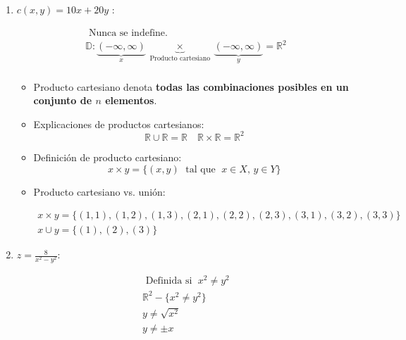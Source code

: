 \begin{enumerate}
    \item $c(x,y)=10x+20y$ : 
        \begin{center}
           \begin{align*}
               \text{  Nunca se indefine.  } \\ 
               \mathbb{D}: \underbrace{(-\infty,\infty )}_{x} \underbrace{\times}_{\text{  Producto cartesiano  }} \underbrace{(-\infty ,\infty )}_{y} = \mathbb{R}^2 \\ 
           \end{align*}
           \begin{itemize}[label=\#]
               \item Producto cartesiano denota \textbf{todas las combinaciones posibles en un conjunto de $n$ elementos}.
               \item Explicaciones de productos cartesianos:
                \[
                  \mathbb{R} \cup  \mathbb{R} = \mathbb{R} \quad \mathbb{R} \times \mathbb{R} = \mathbb{R}^2     
                \]
                
                \item Definición de producto cartesiano:
                    \[
                      x \times y = \{(x,y) \; \text{  tal que  } \; x \in X, \, y \in Y \}
                    \]
                
                \item Producto cartesiano vs. unión:
                    \begin{center}
                       \begin{align*}
                           x \times y = \{(1,1),(1,2),(1,3),(2,1),(2,2),(2,3),(3,1),(3,2),(3,3)\} \\ 
                           x \cup y = \{(1),(2),(3)\}
                       \end{align*}
                    \end{center}
           \end{itemize}
        \end{center}
    
    \item $z = \frac{8}{x^2-y^2} $:
        \begin{center}
           \begin{align*}
               \text{  Definida si   } \; x^2 \neq y^2 \\ 
               \mathbb{R}^2 - \{x^2\neq y^2\} \\ 
               y \neq \sqrt{x^2} \\ 
               y \neq \pm x \\ 
           \end{align*}
        \end{center}
    

\end{enumerate}
